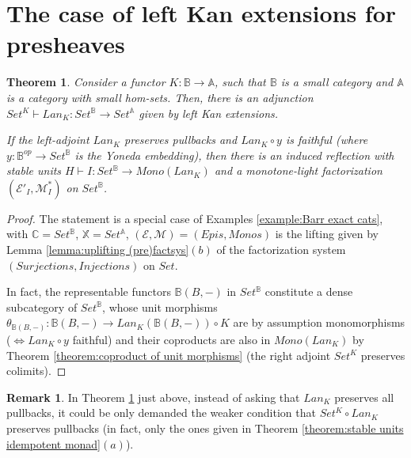 \documentclass[12pt,a4paper]{amsart}
\newtheorem{theorem}{Theorem}[section]
\theoremstyle{definition}
\newtheorem{remark}{Remark}[section]
\begin{document}
\section{The case of left Kan extensions for presheaves}\label{sec:left Kan extensions}

\begin{theorem}\label{theorem:leftKanpresheavesverywellbehaved} Consider a functor $K:\mathbb{B}\rightarrow\mathbb{A}$, such that $\mathbb{B}$ is a small category and $\mathbb{A}$ is a category with small hom-sets. Then, there is an adjunction $Set^K\vdash Lan_K:Set^\mathbb{B}\rightarrow Set^\mathbb{A}$ given by left Kan extensions.

If the left-adjoint $Lan_K$ preserves pullbacks and $Lan_K\circ y$ is faithful (where $y:\mathbb{B}^{op}\rightarrow Set^\mathbb{B}$ is the Yoneda embedding), then there is an induced reflection with stable units $H\vdash I:Set^\mathbb{B}\rightarrow Mono(Lan_K)$ and a monotone-light factorization $(\mathcal{E}'_I,\mathcal{M}^*_I)$ on $Set^\mathbb{B}$.
\end{theorem}

\begin{proof}
The statement is a special case of Examples \ref{example:Barr exact cats}, with $\mathbb{C}=Set^\mathbb{B}$, $\mathbb{X}=Set^\mathbb{A}$, $(\mathcal{E},\mathcal{M})=(Epis, Monos)$ is the lifting given by Lemma \ref{lemma:uplifting (pre)factsys}$(b)$ of the factorization system $(Surjections,Injections)$ on $Set$.

In fact, the representable functors $\mathbb{B}(B,-)$ in $Set^\mathbb{B}$ constitute a dense subcategory of $Set^\mathbb{B}$, whose unit morphisms $\theta_{\mathbb{B}(B,-)}:\mathbb{B}(B,-)\rightarrow Lan_K(\mathbb{B}(B,-))\circ K$ are by assumption monomorphisms ($\Leftrightarrow Lan_K\circ y$ faithful) and their coproducts are also in $Mono(Lan_K)$ by Theorem \ref{theorem:coproduct of unit morphisms} (the right adjoint $Set^K$ preserves colimits).\end{proof}

\begin{remark}\label{remark:LanK preserves pullbacks too strong}
In Theorem \ref{theorem:leftKanpresheavesverywellbehaved} just above, instead of asking that $Lan_K$ preserves all pullbacks, it could be only demanded the weaker condition that $Set^K\circ Lan_K$ preserves pullbacks (in fact, only the ones given in Theorem \ref{theorem:stable units idempotent monad}$(a)$).
\end{remark}
\end{document}

